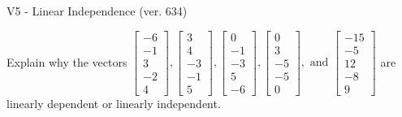 \begin{exercise}
  \begin{exerciseTitle}V5 - Linear Independence (ver. 634)\end{exerciseTitle}
  \begin{exerciseStatement}
    Explain why the vectors \(\left[\begin{array}{r}
-6 \\
-1 \\
3 \\
-2 \\
4
\end{array}\right] , \left[\begin{array}{r}
3 \\
4 \\
-3 \\
-1 \\
5
\end{array}\right] , \left[\begin{array}{r}
0 \\
-1 \\
-3 \\
5 \\
-6
\end{array}\right] , \left[\begin{array}{r}
0 \\
3 \\
-5 \\
-5 \\
0
\end{array}\right] , \text{ and } \left[\begin{array}{r}
-15 \\
-5 \\
12 \\
-8 \\
9
\end{array}\right]\) are linearly dependent or linearly independent.	



\end{exerciseStatement}
\end{exercise}
